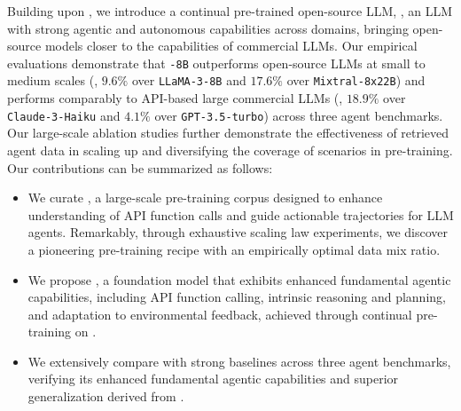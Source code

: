 Building upon \dataset, we introduce a continual pre-trained open-source LLM, \method, an LLM with strong agentic and autonomous capabilities across domains, bringing open-source models closer to the capabilities of commercial LLMs. 
Our empirical evaluations demonstrate that \texttt{\method-8B} outperforms open-source LLMs at small to medium scales (\eg, $9.6\%$ over \texttt{LLaMA-3-8B} and $17.6\%$ over \texttt{Mixtral-8x22B}) and performs comparably to API-based large commercial LLMs (\eg, $18.9\%$ over \texttt{Claude-3-Haiku} and $4.1\%$ over \texttt{GPT-3.5-turbo}) across three agent benchmarks. 
Our large-scale ablation studies further demonstrate the effectiveness of retrieved agent data in scaling up and diversifying the coverage of scenarios in pre-training.
Our contributions can be summarized as follows:
\begin{itemize}[leftmargin=0.6cm]
\setlength\itemsep{-0.2em}
\item We curate \dataset, a large-scale pre-training corpus designed to enhance understanding of API function calls and guide actionable trajectories for LLM agents. 
Remarkably, through exhaustive scaling law experiments, we discover a pioneering pre-training recipe with an empirically optimal data mix ratio. 
\item We propose \method, a foundation model that exhibits enhanced fundamental agentic capabilities, including API function calling, intrinsic reasoning and planning, and adaptation to environmental feedback, achieved through continual pre-training on \dataset.
\item We extensively compare \method with strong baselines across three agent benchmarks, verifying its enhanced fundamental agentic capabilities and superior generalization derived from \dataset. 
\end{itemize}

